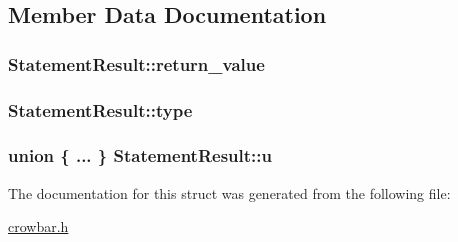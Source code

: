 \subsection{Member Data Documentation}
\hypertarget{struct_statement_result_a83ca729f73987f1358be29ca21c2349e}{}
\subsubsection[{return\+\_\+value}]{ Statement\+Result\+::return\+\_\+value}\label{struct_statement_result_a83ca729f73987f1358be29ca21c2349e}
\hypertarget{struct_statement_result_a1c65be71416a40eea23153d5af3f7d19}{}
\subsubsection[{type}]{ Statement\+Result\+::type}\label{struct_statement_result_a1c65be71416a40eea23153d5af3f7d19}
\hypertarget{struct_statement_result_a3922b8f85edf104dbe464831804f9816}{}
\subsubsection[{u}]{\setlength{\rightskip}{0pt plus 5cm}union \{ ... \}   Statement\+Result\+::u}\label{struct_statement_result_a3922b8f85edf104dbe464831804f9816}


The documentation for this struct was generated from the following file\+:\begin{DoxyCompactItemize}
\item 
\hyperlink{crowbar_8h}{crowbar.\+h}\end{DoxyCompactItemize}
